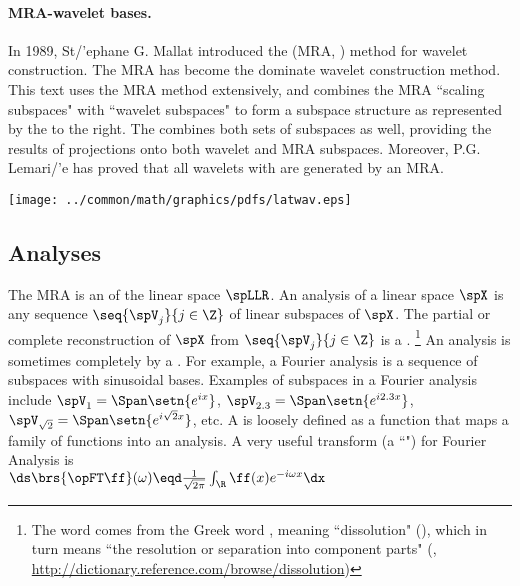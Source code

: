 \begin{minipage}{\tw-65mm}
  \paragraph{MRA-wavelet bases.}
  In 1989, St{/'e}phane G. Mallat introduced the  (MRA, )
  method for wavelet construction. The MRA has become the dominate wavelet construction method.
  This text uses the MRA method extensively, 
  and combines the MRA ``scaling subspaces"  with ``wavelet subspaces"  
  to form a subspace structure as represented by the 
   to the right.
  The  combines both sets of subspaces as well, 
  providing the results of projections onto both wavelet and MRA subspaces.
  Moreover, P.G. Lemari{/'e} has proved that all wavelets with  are generated by an MRA.\footnotemark
\end{minipage}\hfill%
\begin{minipage}{60mm}
  \texttt{[image: ../common/math/graphics/pdfs/latwav.eps]}%
\end{minipage}


\subsection{Analyses}
The MRA is an  of the linear space $\spLLR$.
An analysis of a linear space $\spX$ is any sequence $\seq{\spV_j}{j\in\Z}$ of linear subspaces of $\spX$.
        The partial or complete reconstruction of $\spX$ from $\seq{\spV_j}{j\in\Z}$ is a .%
        \footnote{%
          The word  comes from the Greek word
          {},
          meaning ``dissolution" (),
          which in turn means
          ``the resolution or separation into component parts"
          (, \scs\url{http://dictionary.reference.com/browse/dissolution})
          }
  An analysis is sometimes completely  by a .
  For example, a Fourier analysis is a sequence of subspaces with sinusoidal bases.
  Examples of subspaces in a Fourier analysis include $\spV_1=\Span\setn{e^{ix}}$, 
  $\spV_{2.3}=\Span\setn{e^{i2.3x}}$, $\spV_{\sqrt{2}}=\Span\setn{e^{i\sqrt{2}x}}$, etc.
  A  is loosely defined as a function that maps a family of functions
  into an analysis.
  A very useful transform (a ``") for Fourier Analysis is 
  \\\indentx$\ds\brs{\opFT\ff}(\omega) \eqd \frac{1}{\sqrt{2\pi}} \int_\R \ff(x) e^{-i\omega x} \dx$


